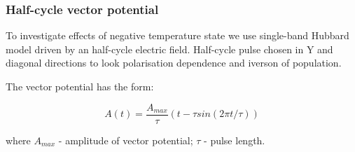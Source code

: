 \subsubsection{Half-cycle vector potential}


To investigate effects of negative temperature state we use single-band Hubbard model driven by an half-cycle electric field. Half-cycle pulse chosen in Y and diagonal directions to look polarisation dependence and iverson of population.

The vector potential has the form:

\begin{equation}
A(t)=\frac{A_{max}}{\tau}(t-\tau sin(2\pi t/\tau))
\end{equation}

where $A_{max}$ - amplitude of vector potential; $\tau$ - pulse length.

